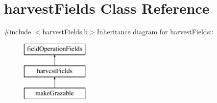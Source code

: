 \hypertarget{classharvest_fields}{
\section{harvestFields Class Reference}
\label{classharvest_fields}
}


{\ttfamily \#include $<$harvestFields.h$>$}Inheritance diagram for harvestFields::\begin{figure}[H]
\begin{center}
\leavevmode
\includegraphics[height=3cm]{classharvest_fields}
\end{center}
\end{figure}

